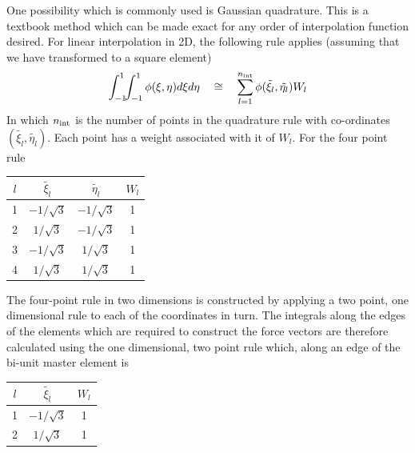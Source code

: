 \documentclass[10pt]{article}
\begin{document}
	One possibility which is commonly used is Gaussian quadrature. 
	This is a textbook method which can be made exact for any 
	order of interpolation function desired. For linear interpolation in
	2D, the following rule applies (assuming that we have
	transformed to a square element)	
		\begin{equation}
			\int_{-1}^{1} \!\! \int_{-1}^{1} \phi(\xi,\eta) d\xi d\eta  \ \ \ \cong \ \ \ 
			\sum_{l=1}^{n_{\rm int}} \phi( \tilde{ \xi_l}, \tilde{ \eta_l}) W_l
		\end{equation}
	In which $n_{\rm int}$ is the number of points in the quadrature rule with co-ordinates $(\tilde{ \xi_l}, \tilde{ \eta_l})$.
	Each point has a weight associated with it of $W_l$. For the four point rule 
	\begin{center}
		\begin{tabular}{||c|c|c|c||} \hline
			\hspace{5mm}$l$\hspace{5mm} &
			\hspace{5mm}$\tilde{\xi_l}$\hspace{5mm} &
			\hspace{5mm}$\tilde{\eta_l}$\hspace{5mm} &
			\hspace{5mm}$W_l$\hspace{5mm} \\ \hline
			1 & $-1/\sqrt{3}$ & $-1/\sqrt{3}$ & 1 \\
			2 & $1/\sqrt{3}$ & $-1/\sqrt{3}$ & 1 \\
			3 & $-1/\sqrt{3}$ & $1/\sqrt{3}$ & 1 \\
			4 & $1/\sqrt{3}$ & $1/\sqrt{3}$ & 1 \\ \hline
		\end{tabular}
	\end{center}
The four-point rule in two dimensions is constructed by applying a two point, one dimensional rule to each of
the coordinates in turn. The integrals along the edges of the elements which are required to construct the 
force vectors are therefore calculated using the one dimensional, two point rule which, along an edge of the
bi-unit master element is
	\begin{center}
		\begin{tabular}{||c|c|c||} \hline
			\hspace{5mm}$l$\hspace{5mm} &
			\hspace{5mm}$\tilde{\xi_l}$\hspace{5mm} &
			\hspace{5mm}$W_l$\hspace{5mm} \\ \hline
			1 & $-1/\sqrt{3}$ & 1 \\
			2 & $1/\sqrt{3}$  & 1 \\ \hline
		\end{tabular}
	\end{center}
			
\end{document}
